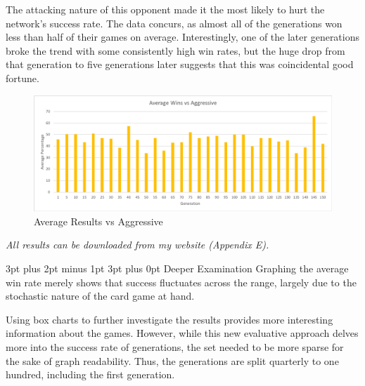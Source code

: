 \documentclass[12pt,a4paper]{article}
\makeatletter
\renewcommand\subsection{\@startsection {subsection}{1}{2mm} %
                               {3pt plus 2pt minus 1pt} %
                               {3pt plus 0pt} %
                               {\normalfont\bfseries}}
\makeatother
\begin{document}
\newpage
The attacking nature of this opponent made it the most likely to hurt the network's success rate. The data concurs, as almost all of the generations won less than half of their games on average. Interestingly, one of the later generations broke the trend with some consistently high win rates, but the huge drop from that generation to five generations later suggests that this was coincidental good fortune.

\begin{figure}[h]
	\centering
	\includegraphics[width = \textwidth]{Agg1.png}
	\caption{Average Results vs Aggressive}
\end{figure}


\begin{small}
	\begin{center}
		\textit{All results can be downloaded from my website (Appendix E).}
	\end{center}
\end{small}

\subsection{Deeper Examination}
Graphing the average win rate merely shows that success fluctuates across the range, largely due to the stochastic nature of the card game at hand. 

Using box charts to further investigate the results provides more interesting information about the games. However, while this new evaluative approach delves more into the success rate of generations, the set needed to be more sparse for the sake of graph readability. Thus, the generations are split quarterly to one hundred, including the first generation. \\
\end{document}
